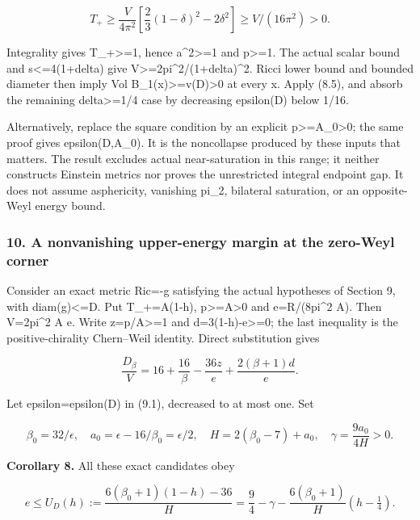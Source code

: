 \documentclass[
  10pt,
]{article}
\begin{document}
\[
 T_+\ge\frac{V}{4\pi^2}
       \left[\frac23(1-\delta)^2-2\delta^2\right]
       \ge V/(16\pi^2)>0.
\]

Integrality gives T\_+\textgreater=1, hence a\^{}2\textgreater=1 and
p\textgreater=1. The actual scalar bound and
\textbar s\textbar\textless=4(1+delta) give
V\textgreater=2pi\^{}2/(1+delta)\^{}2. Ricci lower bound and bounded
diameter then imply Vol B\_1(x)\textgreater=v(D)\textgreater0 at every
x. Apply (8.5), and absorb the remaining delta\textgreater=1/4 case by
decreasing epsilon(D) below 1/16.

Alternatively, replace the square condition by an explicit
p\textgreater=A\_0\textgreater0; the same proof gives epsilon(D,A\_0).
It is the noncollapse produced by these inputs that matters. The result
excludes actual near-saturation in this range; it neither constructs
Einstein metrics nor proves the unrestricted integral endpoint gap. It
does not assume asphericity, vanishing pi\_2, bilateral saturation, or
an opposite-Weyl energy bound.

\hypertarget{a-nonvanishing-upper-energy-margin-at-the-zero-weyl-corner}{%
\subsubsection{10. A nonvanishing upper-energy margin at the zero-Weyl
corner}\label{a-nonvanishing-upper-energy-margin-at-the-zero-weyl-corner}}

Consider an exact metric Ric=-g satisfying the actual hypotheses of
Section 9, with diam(g)\textless=D. Put T\_+=A(1-h),
p\textgreater=A\textgreater0 and e=R/(8pi\^{}2 A). Then V=2pi\^{}2 A e.
Write z=p/A\textgreater=1 and d=3(1-h)-e\textgreater=0; the last
inequality is the positive-chirality Chern--Weil identity. Direct
substitution gives

\[
 \frac{D_\beta}{V}=16+\frac{16}{\beta}-\frac{36z}{e}
                         +\frac{2(\beta+1)d}{e}.       \tag{10.1}
\]

Let epsilon=epsilon(D) in (9.1), decreased to at most one. Set

\[
 \beta_0=32/\epsilon,\quad a_0=\epsilon-16/\beta_0=\epsilon/2,
 \quad H=2(\beta_0-7)+a_0,\quad
 \gamma=\frac{9a_0}{4H}>0.
\]

\textbf{Corollary 8.} All these exact candidates obey

\[
 \boxed{e\le U_D(h):=
       \frac{6(\beta_0+1)(1-h)-36}{H}
       =\frac94-\gamma-
          \frac{6(\beta_0+1)}H(h-\tfrac14).}           \tag{10.2}
\]
\end{document}
